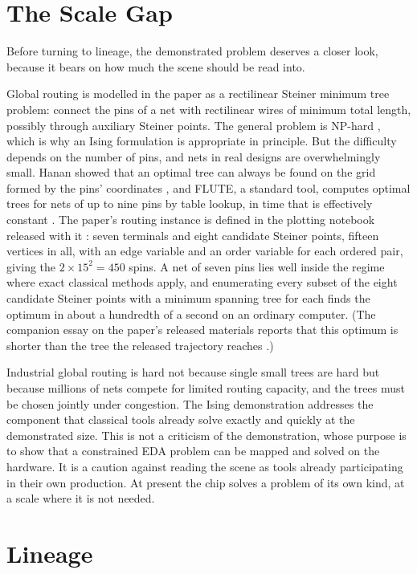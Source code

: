 \documentclass[11pt]{article}
\theoremstyle{definition}
\theoremstyle{remark}
\begin{document}
\section{The Scale Gap}

Before turning to lineage, the demonstrated problem deserves a closer look, because it bears on how much the scene should be read into.

Global routing is modelled in the paper as a rectilinear Steiner minimum tree problem: connect the pins of a net with rectilinear wires of minimum total length, possibly through auxiliary Steiner points. The general problem is NP-hard \cite{garey1977}, which is why an Ising formulation is appropriate in principle. But the difficulty depends on the number of pins, and nets in real designs are overwhelmingly small. Hanan showed that an optimal tree can always be found on the grid formed by the pins' coordinates \cite{hanan1966}, and FLUTE, a standard tool, computes optimal trees for nets of up to nine pins by table lookup, in time that is effectively constant \cite{chu2008}. The paper's routing instance is defined in the plotting notebook released with it \cite{vsimrepo}: seven terminals and eight candidate Steiner points, fifteen vertices in all, with an edge variable and an order variable for each ordered pair, giving the $2 \times 15^2 = 450$ spins. A net of seven pins lies well inside the regime where exact classical methods apply, and enumerating every subset of the eight candidate Steiner points with a minimum spanning tree for each finds the optimum in about a hundredth of a second on an ordinary computer. (The companion essay on the paper's released materials reports that this optimum is shorter than the tree the released trajectory reaches \cite{flyxion-replot}.)

Industrial global routing is hard not because single small trees are hard but because millions of nets compete for limited routing capacity, and the trees must be chosen jointly under congestion. The Ising demonstration addresses the component that classical tools already solve exactly and quickly at the demonstrated size. This is not a criticism of the demonstration, whose purpose is to show that a constrained EDA problem can be mapped and solved on the hardware. It is a caution against reading the scene as tools already participating in their own production. At present the chip solves a problem of its own kind, at a scale where it is not needed.

\section{Lineage}
\end{document}
